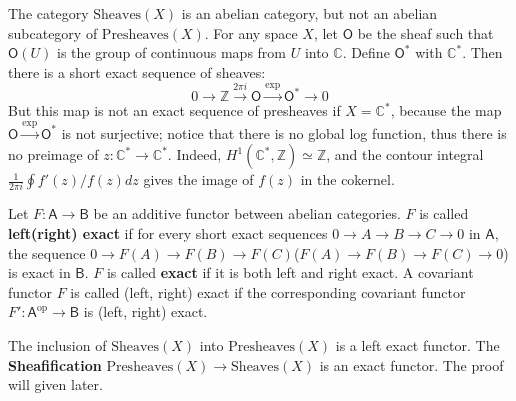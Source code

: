 \begin{exmp} The category $\textrm{Sheaves}(X)$ is an abelian category, but not an abelian subcategory of $\textrm{Presheaves}(X)$. For any space $X$, let $\mathsf{O}$ be the sheaf such that $\mathsf{O}(U)$ is the group of continuous maps from $U$ into $\mathbb{C}$. Define $\mathsf{O}^*$ with $\mathbb{C}^*$. Then there is a short exact sequence of sheaves:
\begin{equation}
0\rightarrow \mathbb{Z}\xrightarrow{2\pi i}\mathsf{O}\xrightarrow{\textrm{exp}}\mathsf{O}^*\rightarrow 0
\end{equation}
But this map is not an exact sequence of presheaves if $X=\mathbb{C}^*$, because the map $\mathsf{O}\xrightarrow{\textrm{exp}}\mathsf{O}^*$ is not surjective; notice that there is no global log function, thus there is no preimage of $z:\mathbb{C}^*\rightarrow \mathbb{C}^*$. Indeed, $H^1(\mathbb{C}^*,\mathbb{Z})\simeq \mathbb{Z}$, and the contour integral $\frac{1}{2\pi i}\oint f'(z)/f(z) dz$ gives the image of $f(z)$ in the cokernel.
\end{exmp}

\begin{defn} Let $F:\mathsf{A}\rightarrow \mathsf{B}$ be an additive functor between abelian categories. $F$ is called \textbf{left(right) exact} if for every short exact sequences $0\rightarrow A\rightarrow B\rightarrow C\rightarrow 0$ in $\mathsf{A}$, the sequence $0\rightarrow F(A)\rightarrow F(B)\rightarrow F(C)$($F(A)\rightarrow F(B)\rightarrow F(C)\rightarrow 0$) is exact in $\mathsf{B}$. $F$ is called \textbf{exact} if it is both left and right exact. A covariant functor $F$ is called (left, right) exact if the corresponding covariant functor $F':\mathsf{A}^{\textrm{op}}\rightarrow \mathsf{B}$ is (left, right) exact.
\end{defn}

\begin{exmp} The inclusion of $\textrm{Sheaves}(X)$ into $\textrm{Presheaves}(X)$ is a left exact functor. The \textbf{Sheafification} $\textrm{Presheaves}(X)\rightarrow \textrm{Sheaves}(X)$ is an exact functor. The proof will given later.
\end{exmp}

